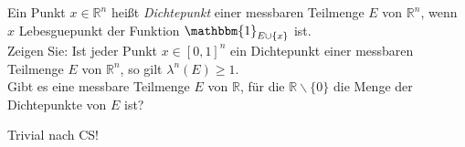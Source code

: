 \begin{exercise}

Ein Punkt $x \in \mathbb{R}^n$ heißt \textit{Dichtepunkt} einer messbaren Teilmenge $E$ von $\mathbb{R}^n$, wenn $x$ Lebesguepunkt der Funktion $\mathbbm{1}_{E\cup\{x\}}$ ist. \\

Zeigen Sie: Ist jeder Punkt $x \in [0,1]^n$ ein Dichtepunkt einer messbaren Teilmenge $E$ von $\mathbb{R}^n$, so gilt $\lambda^n(E) \geq 1$. \\

Gibt es eine messbare Teilmenge $E$ von $\mathbb{R}$, für die $\mathbb{R}\backslash\{0\}$ die Menge der Dichtepunkte von $E$ ist?

\end{exercise}

\begin{solution}

  Trivial nach CS!












\end{solution}
